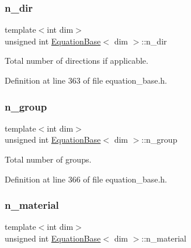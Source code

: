\subsubsection{\texorpdfstring{n\+\_\+dir}{n\_dir}}
{\footnotesize\ttfamily template$<$int dim$>$ \\
unsigned int \hyperlink{class_equation_base}{Equation\+Base}$<$ dim $>$\+::n\+\_\+dir\hspace{0.3cm}{\ttfamily [protected]}}



Total number of directions if applicable. 



Definition at line 363 of file equation\+\_\+base.\+h.

\mbox{\label{class_equation_base_adf5fc09a70820108fd273b0e2183db55}} 
\subsubsection{\texorpdfstring{n\+\_\+group}{n\_group}}
{\footnotesize\ttfamily template$<$int dim$>$ \\
unsigned int \hyperlink{class_equation_base}{Equation\+Base}$<$ dim $>$\+::n\+\_\+group\hspace{0.3cm}{\ttfamily [protected]}}



Total number of groups. 



Definition at line 366 of file equation\+\_\+base.\+h.

\mbox{\label{class_equation_base_a6eba5e7408331bce23945068cba4ed19}} 
\subsubsection{\texorpdfstring{n\+\_\+material}{n\_material}}
{\footnotesize\ttfamily template$<$int dim$>$ \\
unsigned int \hyperlink{class_equation_base}{Equation\+Base}$<$ dim $>$\+::n\+\_\+material\hspace{0.3cm}{\ttfamily [protected]}}



